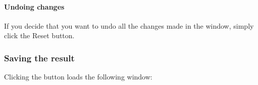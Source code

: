 \documentclass[letterpaper,10pt,english]{sphinxmanual}
\begin{document}
\paragraph{Undoing changes}
\label{\detokenize{gui/usage/result:undoing-changes}}
\sphinxAtStartPar
If you decide that you want to undo all the changes made in the
 window, simply click the Reset button.


\subsubsection{Saving the result}
\label{\detokenize{gui/usage/result:saving-the-result}}
\sphinxAtStartPar
Clicking the  button loads the following window:

\end{document}
